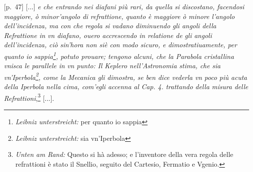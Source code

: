 \pstart {} [p.~47] [...] \textit{e che entrando nei diafani pi\`{u} rari, da quella si discostano, facendosi maggiore, \`{o} minor'angolo di refrattione\protect{}, quanto \`{e} maggiore \`{o} minore l'angolo dell'incidenza\protect{}, ma con che regola si vadano diminuendo gli angoli della Refrattione\protect{}\protect{} in vn diafano, ouero accrescendo in relatione de gli angoli dell'incidenza\protect{}\protect{}\protect{}, ci\`{o} sin'hora non si\`{e} con modo sicuro, e dimostratiuamente, per quanto io sappia\footnote{\textit{Leibniz unterstreicht:} per quanto io sappia}, potuto prouare; tengono alcuni, che la Parabola cristallina vnisca le parallele in vn punto: Il Keplero\protect{} nell'Astronomia  stima, che sia vn'Iperbola\footnote{\textit{Leibniz unterstreicht:} sia vn'Iperbola}, come la Mecanica gli dimostra, se ben dice vederla vn poco pi\`{u} acuta della Iperbola nella cima, com'egli accenna al Cap. 4. trattando della misura delle Refrattioni}\protect{},\footnote{\textit{Unten am Rand:} Questo si h\`{a} adesso; e l'inventore della vera regola delle refrattioni \`{e} stato il Snellio\protect{}, seguito del Cartesio\protect{}, Fermatio\protect{} e Vgenio.\protect{}} [...].\pend